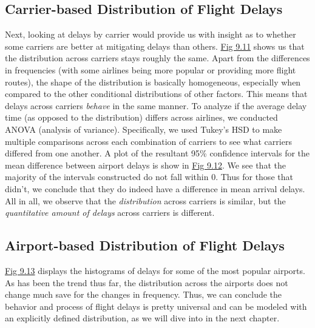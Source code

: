 \documentclass[12pt, a4paper, openany]{book}
\newcommand\tab[1][1cm]{\hspace*{#1}}
\begin{document}
		\subsection{Carrier-based Distribution of Flight Delays}
			
			\tab Next, looking at delays by carrier would provide us with insight as to whether some carriers are better at mitigating delays than others. \underline{Fig 9.11} shows us that the distribution across carriers stays roughly the same. Apart from the differences in frequencies (with some airlines being more popular or providing more flight routes), the shape of the distribution is basically homogeneous, especially when compared to the other conditional distributions of other factors. This means that delays across carriers \textit{behave} in the same manner. To analyze if the average delay time (as opposed to the distribution) differs across airlines, we conducted ANOVA (analysis of variance). Specifically, we used Tukey’s HSD to make multiple comparisons across each combination of carriers to see what carriers differed from one another. A plot of the resultant 95\% confidence intervals for the mean difference between airport delays is show in \underline{Fig 9.12}. We see that the majority of the intervals constructed do not fall within 0. Thus for those that didn’t, we conclude that they do indeed have a difference in mean arrival delays. All in all, we observe that the \textit{distribution} across carriers is similar, but the \textit{quantitative amount of delays} across carriers is different. \\

		\subsection{Airport-based Distribution of Flight Delays}
			
			\tab \underline{Fig 9.13} displays the histograms of delays for some of the most popular airports. As has been the trend thus far, the distribution across the airports does not change much save for the changes in frequency. Thus, we can conclude the behavior and process of flight delays is pretty universal and can be modeled with an explicitly defined distribution, as we will dive into in the next chapter. \\ 
\end{document}
